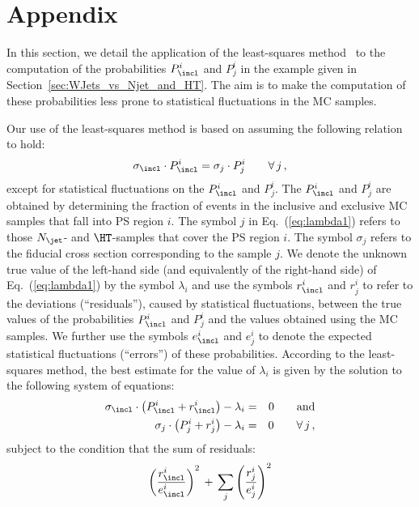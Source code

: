 \section{Appendix}
\label{sec:appendix}

In this section, we detail the application of the least-squares method~\cite{Cowan:1998ji}
to the computation of the probabilities $P_{\incl}^{i}$ and $P_{j}^{i}$
in the example given in Section~\ref{sec:WJets_vs_Njet_and_HT}.
The aim is to make the computation of these probabilities less prone to statistical fluctuations in the MC samples.

Our use of the least-squares method is based on assuming the following relation to hold:
\begin{equation}
\sigma_{\incl} \cdot P_{\incl}^{i} = \sigma_{j} \cdot P_{j}^{i} \qquad \forall \, j \, ,
\label{eq:lambda1}
\end{equation}
except for statistical fluctuations on the $P_{\incl}^{i}$ and $P_{j}^{i}$.
The $P_{\incl}^{i}$ and $P_{j}^{i}$ are obtained by determining the fraction of events in the inclusive and exclusive MC samples that fall into PS region $i$.
The symbol $j$ in Eq.~(\ref{eq:lambda1}) refers to those $N_{\jet}$- and $\HT$-samples that cover the PS region $i$.
The symbol $\sigma_{j}$ refers to the fiducial cross section corresponding to the sample $j$.
We denote the unknown true value of the left-hand side (and equivalently of the right-hand side) of Eq.~(\ref{eq:lambda1}) by the symbol $\lambda_{i}$
and use the symbols $r_{\incl}^{i}$ and $r_{j}^{i}$ to refer to the deviations (``residuals''), caused by statistical fluctuations,
between the true values of the probabilities $P_{\incl}^{i}$ and $P_{j}^{i}$ and the values obtained using the MC samples.
We further use the symbols $e_{\incl}^{i}$ and $e_{j}^{i}$ to denote the expected statistical fluctuations (``errors'') of these probabilities.
According to the least-squares method,
the best estimate for the value of $\lambda_{i}$ is given by the solution to the following system of equations:
\begin{eqnarray*}
\sigma_{\incl} \cdot \left( P_{\incl}^{i} + r_{\incl}^{i} \right) - \lambda_{i} & = & 0 \qquad \mbox{and} \\
\sigma_{j} \cdot \left( P_{j}^{i} + r_{j}^{i} \right) - \lambda_{i} & = & 0 \qquad \forall \, j \, ,
\end{eqnarray*}
subject to the condition that the sum of residuals:
\begin{equation*}
\left( \frac{r_{\incl}^{i}}{e_{\incl}^{i}} \right)^{2} \, + \, \sum_{j} \left( \frac{r_{j}^{i}}{e_{j}^{i}} \right)^{2}
\end{equation*}
